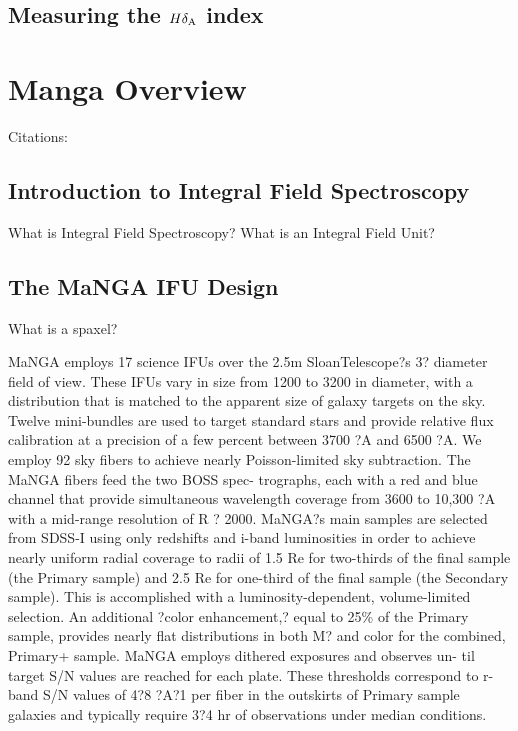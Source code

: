 \subsection{Measuring the $H\delta_{\rm A}$ index}

\section{Manga Overview}
Citations: \citep{bundy_overview_2014}

\subsection{Introduction to Integral Field Spectroscopy}
What is Integral Field Spectroscopy? What is an Integral Field Unit? 

\subsection{The MaNGA IFU Design}
What is a spaxel? \citep{drory_manga_2015}

MaNGA employs 17 science IFUs over the 2.5m SloanTelescope?s 3? diameter field of view. These IFUs vary in size from 1200 to 3200 in diameter, with a distribution that is matched to the apparent size of galaxy targets on
the sky. Twelve mini-bundles are used to target standard stars and provide relative flux calibration at a precision of a few percent between 3700 ?A and 6500 ?A. We employ 92 sky fibers to achieve nearly Poisson-limited sky subtraction. The MaNGA fibers feed the two BOSS spec- trographs, each with a red and blue channel that provide simultaneous wavelength coverage from 3600 to 10,300 ?A with a mid-range resolution of R ? 2000. MaNGA?s main samples are selected from SDSS-I using only redshifts and i-band luminosities in order to achieve nearly uniform radial coverage to radii of 1.5 Re for two-thirds of the final sample (the Primary sample) and 2.5 Re for one-third of the final sample (the Secondary sample). This is accomplished with a luminosity-dependent, volume-limited selection. An additional ?color enhancement,? equal to 25\% of the Primary sample, provides nearly flat distributions in both M? and color for the combined, Primary+ sample.
MaNGA employs dithered exposures and observes un- til target S/N values are reached for each plate. These thresholds correspond to r-band S/N values of 4?8 ?A?1 per fiber in the outskirts of Primary sample galaxies and typically require 3?4 hr of observations under median conditions.

